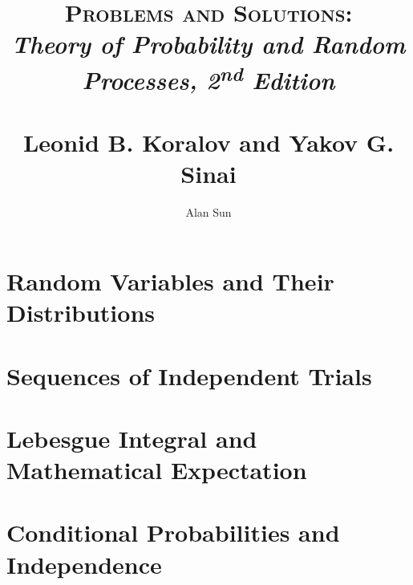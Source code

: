 \documentclass{report}
\title{\textsc{Problems and Solutions:} \\ 
\textit{Theory of Probability and Random Processes, 2\textsuperscript{nd} Edition} \\ 
~\\ \large Leonid B. Koralov and Yakov G. Sinai}
\author{Alan Sun}
\date{}
\begin{document}
\maketitle

\chapter{Random Variables and Their Distributions}

\chapter{Sequences of Independent Trials}

\chapter{Lebesgue Integral and Mathematical Expectation}

\chapter{Conditional Probabilities and Independence}

\end{document}
